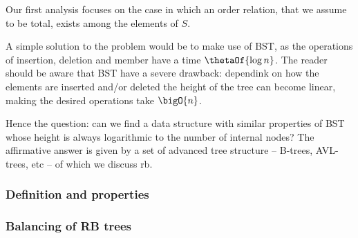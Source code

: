 \documentclass{subfiles}
\begin{document}
    Our first analysis focuses on the case in which an order relation, 
        that we assume to be total, exists among the elements of \(S\).

    A simple solution to the problem would be to make use of BST, 
        as the operations of insertion, deletion and member have a time \(\thetaOf{\log n}\).
        The reader should be aware that BST have a severe drawback: 
        dependink on how the elements are inserted and/or deleted the 
        height of the tree can become linear, making the desired operations take \(\bigO{n}\).

    Hence the question: can we find a data structure with similar properties of BST 
        whose height is always logarithmic to the number of internal nodes? 
        The affirmative answer is given by a set of advanced tree structure -- 
        B-trees, AVL-trees, etc -- of which we discuss \gls{rb}.

    \subsubsection{Definition and properties}
    

    \subsubsection{Balancing of RB trees}
    

\end{document}
